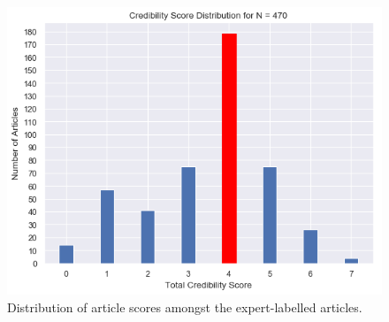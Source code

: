 \documentclass[a4paper,twoside,phd]{BYUPhys}
\begin{document}
\begin{figure}[!htb]
	\centering
	\includegraphics[totalheight=7cm]{images/article-score-distribution.png}
	\caption{Distribution of article scores amongst the expert-labelled articles.}
	\label{fig:ArticleDistribution}
\end{figure}
\end{document}

